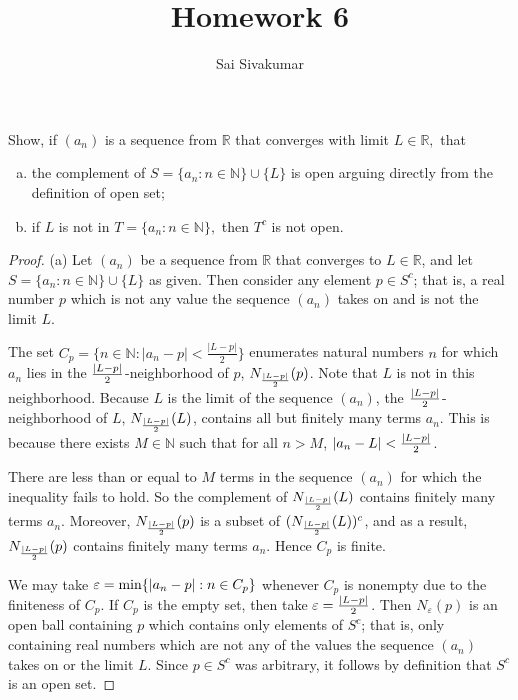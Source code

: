 \documentclass[12pt]{amsart}
\title{Homework 6}
\author{Sai Sivakumar}
\begin{document}
\maketitle

Show, if $(a_n)$ is a sequence from $\mathbb{R}$ that converges with limit $L\in \mathbb{R},$
that
\begin{enumerate}[(a)]
 \item the complement of $S=\{a_n:n\in\mathbb{N}\}\cup \{L\}$ is open
   arguing directly from the definition of open set;
 \item if $L$ is not in $T=\{a_n:n\in \mathbb{N}\},$ then $T^c$ is not open.
\end{enumerate}

\begin{proof}
(a) Let $(a_n)$ be a sequence from $\mathbb{R}$ that converges to $L\in\mathbb{R}$, and let $S = \{a_n:n\in\mathbb{N}\}\cup \{L\}$ as given. Then consider any element $p\in S^c$; that is, a real number $p$ which is not any value the sequence $(a_n)$ takes on and is not the limit $L$.

The set $C_p = \{n\in\mathbb{N}: |a_n-p|<\frac{|L-p|}{2}\}$ enumerates natural numbers $n$ for which $a_n$ lies in the $\frac{\abs{L-p}}{2}$-neighborhood of $p$, $N_{\frac{\abs{L-p}}{2}}(p)$. Note that $L$ is not in this neighborhood. Because $L$ is the limit of the sequence $(a_n)$, the $\frac{\abs{L-p}}{2}$-neighborhood of $L$, $N_{\frac{\abs{L-p}}{2}}(L)$, contains all but finitely many terms $a_n$. This is because there exists $M\in \mathbb{N}$ such that for all $n > M$, $\abs{a_n-L} < \frac{\abs{L-p}}{2}$. 

There are less than or equal to $M$ terms in the sequence $(a_n)$ for which the inequality fails to hold. So the complement of $N_{\frac{\abs{L-p}}{2}}(L)$ contains finitely many terms $a_n$. Moreover, $N_{\frac{\abs{L-p}}{2}}(p)$ is a subset of $(N_{\frac{\abs{L-p}}{2}}(L))^c$, and as a result, $N_{\frac{\abs{L-p}}{2}}(p)$ contains finitely many terms $a_n$. Hence $C_p$ is finite.

We may take $\varepsilon = \min\{\abs{a_n-p} : n\in C_p\}$ whenever $C_p$ is nonempty due to the finiteness of $C_p$. If $C_p$ is the empty set, then take $\varepsilon = \frac{\abs{L-p}}{2}$. Then $N_{\varepsilon}(p)$ is an open ball containing $p$ which contains only elements of $S^c$; that is, only containing real numbers which are not any of the values the sequence $(a_n)$ takes on or the limit $L$. Since $p\in S^c$ was arbitrary, it follows by definition that $S^c$ is an open set.


\end{proof}
\end{document}
